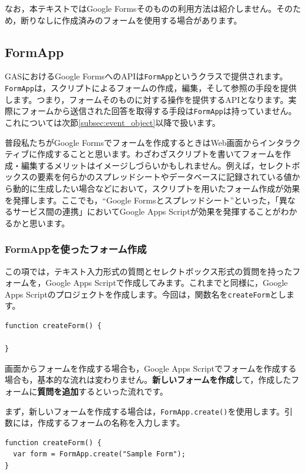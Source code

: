 \documentclass[uplatex,a4j]{jsarticle}
\begin{document}
なお，本テキストではGoogle Formsそのものの利用方法は紹介しません。そのため，断りなしに作成済みのフォームを使用する場合があります。

\subsection{FormApp}

GASにおけるGoogle FormsへのAPIは\verb|FormApp|というクラスで提供されます。\verb|FormApp|は，スクリプトによるフォームの作成，編集，そして参照の手段を提供します。つまり，フォームそのものに対する操作を提供するAPIとなります。実際にフォームから送信された回答を取得する手段は\verb|FormApp|は持っていません。これについては次節\ref{subsec:event_object}以降で扱います。

普段私たちがGoogle Formsでフォームを作成するときはWeb画面からインタラクティブに作成することと思います。わざわざスクリプトを書いてフォームを作成・編集するメリットはイメージしづらいかもしれません。例えば，セレクトボックスの要素を何らかのスプレッドシートやデータベースに記録されている値から動的に生成したい場合などにおいて，スクリプトを用いたフォーム作成が効果を発揮します。ここでも，``Google Formsとスプレッドシート''といった，「異なるサービス間の連携」においてGoogle Apps Scriptが効果を発揮することがわかるかと思います。

\subsubsection{FormAppを使ったフォーム作成}

この項では，テキスト入力形式の質問とセレクトボックス形式の質問を持ったフォームを，Google Apps Scriptで作成してみます。これまでと同様に，Google Apps Scriptのプロジェクトを作成します。今回は，関数名を\verb|createForm|とします。

\begin{lstlisting}[basicstyle=\ttfamily\footnotesize,frame=single,caption=FormApp sample 1]
function createForm() {

}
\end{lstlisting}

画面からフォームを作成する場合も，Google Apps Scriptでフォームを作成する場合も，基本的な流れは変わりません。\textbf{新しいフォームを作成}して，作成したフォームに\textbf{質問を追加}するといった流れです。

まず，新しいフォームを作成する場合は，\verb|FormApp.create()|を使用します。引数には，作成するフォームの名称を入力します。

\begin{lstlisting}[basicstyle=\ttfamily\footnotesize,frame=single,caption=FormApp sample 2]
function createForm() {
  var form = FormApp.create("Sample Form");
}
\end{lstlisting}
\end{document}
